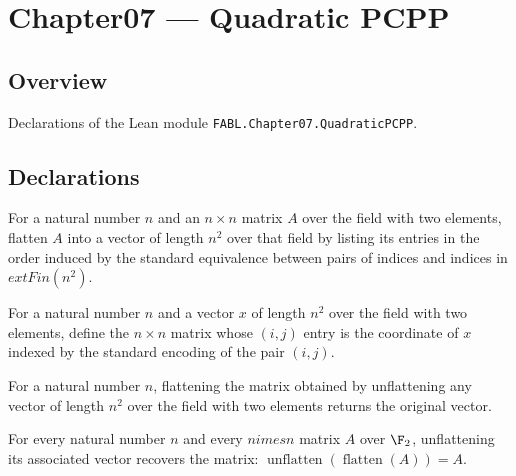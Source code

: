 \chapter{Chapter07 — Quadratic PCPP}
\section{Overview}

Declarations of the Lean module \texttt{FABL.Chapter07.QuadraticPCPP}.

\section{Declarations}

\begin{definition}
\label{FABL.flattenBinaryMatrix}
\leanok
{}
For a natural number $n$ and an $n\times n$ matrix $A$ over the field with two elements,
flatten $A$ into a vector of length $n^2$ over that field by listing its entries in the
order induced by the standard equivalence between pairs of indices and indices in
$	ext{Fin}(n^2)$.
\end{definition}

\begin{definition}
\label{FABL.unflattenBinaryMatrix}
\leanok
{}
For a natural number $n$ and a vector $x$ of length $n^2$ over the field with two
elements, define the $n\times n$ matrix whose $(i,j)$ entry is the coordinate of $x$
indexed by the standard encoding of the pair $(i,j)$.
\end{definition}

\begin{theorem}
\label{FABL.flattenBinaryMatrix_unflattenBinaryMatrix}
\leanok
{}
For a natural number $n$, flattening the matrix obtained by unflattening any vector of
length $n^2$ over the field with two elements returns the original vector.
\end{theorem}

\begin{theorem}
\label{FABL.unflattenBinaryMatrix_flattenBinaryMatrix}
\leanok
{}
For every natural number $n$ and every $n 	imes n$ matrix $A$ over $\F_2$, unflattening
its associated vector recovers the matrix:
$\operatorname{unflatten}(\operatorname{flatten}(A))=A$.
\end{theorem}

